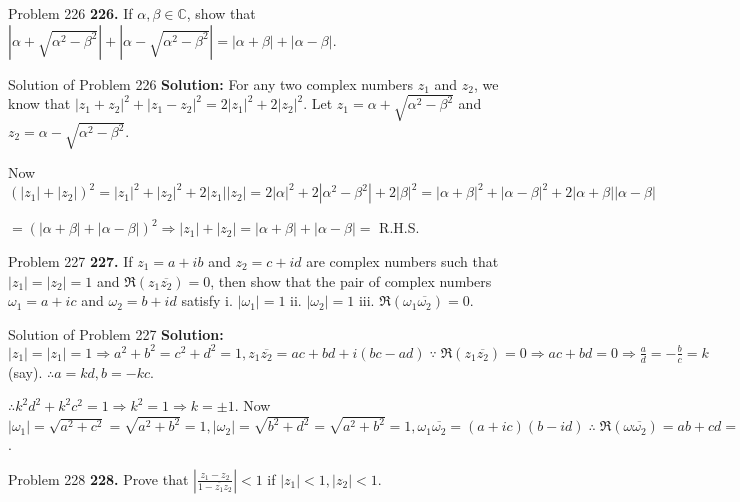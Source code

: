 \documentclass[aspectratio=169,8pt]{beamer}
\begin{document}
\begin{frame}{Problem 226}
  \textbf{226.} If $\alpha, \beta \in\mathbb{C}$, show that $|\alpha + \sqrt{\alpha^2 - \beta^2}| + |\alpha
  - \sqrt{\alpha^2 - \beta^2}| = |\alpha + \beta| + |\alpha - \beta|$.
\end{frame}
\begin{frame}{Solution of Problem 226}
  \textbf{Solution:} For any two complex numbers $z_1$ and $z_2$, we know that $|z_1 + z_2|^2 + |z_1 -
  z_2|^2 = 2|z_1|^2 + 2|z_2|^2$. Let $z_1 = \alpha + \sqrt{\alpha^2 - \beta^2}$ and $z_2 = \alpha -
  \sqrt{\alpha^2 - \beta^2}$.

  Now $(|z_1| + |z_2|)^2 = |z_1|^2 + |z_2|^2 + 2|z_1||z_2| = 2|\alpha|^2 + 2|\alpha^2 - \beta^2| +
  2|\beta|^2 = |\alpha + \beta|^2 + |\alpha - \beta|^2 + 2|\alpha + \beta||\alpha -\beta|$

  $= (|\alpha + \beta| + |\alpha - \beta|)^2\Rightarrow |z_1| + |z_2| = |\alpha + \beta| + |\alpha - \beta|
  =$ R.H.S.
\end{frame}
\begin{frame}{Problem 227}
  \textbf{227.} If $z_1 = a + ib$ and $z_2 = c + id$ are complex numbers such that $|z_1| = |z_2| = 1$ and
  $\Re(z_1\overline{z_2}) = 0$, then show that the pair of complex numbers $\omega_1 = a + ic$ and $\omega_2
  = b + id$ satisfy i. $|\omega_1| = 1$ ii. $|\omega_2| = 1$ iii. $\Re(\omega_1\overline{\omega_2}) = 0$.
\end{frame}
\begin{frame}{Solution of Problem 227}
  \textbf{Solution:} $|z_1| = |z_1| = 1 \Rightarrow a^2 + b^2 = c^2 + d^2 = 1, z_1\overline{z_2} = ac + bd + i(bc -
  ad)\;\because\;\Re(z_1\overline{z_2}) = 0 \Rightarrow ac + bd = 0 \Rightarrow \frac{a}{d} = -\frac{b}{c} =
  k$ (say). $\therefore a = kd, b = -kc$.

  $\therefore k^2d^2 + k^2c^2 = 1 \Rightarrow k^2 = 1 \Rightarrow k = \pm 1$. Now $|\omega_1| = \sqrt{a^2 +
    c^2} = \sqrt{a^2 + b^2} = 1, |\omega_2| = \sqrt{b^2 + d^2} = \sqrt{a^2 + b^2} = 1,
  \omega_1\overline{\omega_2} = (a + ic)(b - id)\;\therefore\;\Re(\omega\overline{\omega_2}) = ab + cd = 0$.
\end{frame}
\begin{frame}{Problem 228}
  \textbf{228.} Prove that $\left|\frac{z_1 - z_2}{1 - \overline{z_1}z_2}\right| < 1$ if $|z_1| < 1, |z_2| <
  1$.
\end{frame}
\end{document}
